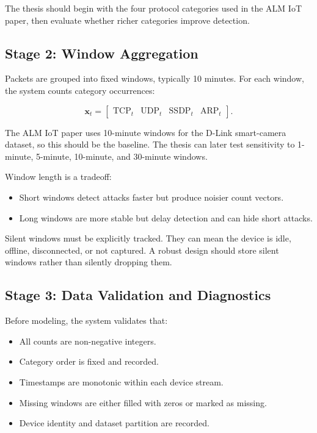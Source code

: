 \documentclass[11pt,a4paper]{article}
\begin{document}
The thesis should begin with the four protocol categories used in the ALM IoT paper, then evaluate whether richer categories improve detection.

\subsection{Stage 2: Window Aggregation}

Packets are grouped into fixed windows, typically 10 minutes. For each window, the system counts category occurrences:

\[
\mathbf{x}_t =
\begin{bmatrix}
\mathrm{TCP}_t & \mathrm{UDP}_t & \mathrm{SSDP}_t & \mathrm{ARP}_t
\end{bmatrix}.
\]

The ALM IoT paper uses 10-minute windows for the D-Link smart-camera dataset, so this should be the baseline. The thesis can later test sensitivity to 1-minute, 5-minute, 10-minute, and 30-minute windows.

Window length is a tradeoff:

\begin{itemize}
  \item Short windows detect attacks faster but produce noisier count vectors.
  \item Long windows are more stable but delay detection and can hide short attacks.
\end{itemize}

Silent windows must be explicitly tracked. They can mean the device is idle, offline, disconnected, or not captured. A robust design should store silent windows rather than silently dropping them.

\subsection{Stage 3: Data Validation and Diagnostics}

Before modeling, the system validates that:

\begin{itemize}
  \item All counts are non-negative integers.
  \item Category order is fixed and recorded.
  \item Timestamps are monotonic within each device stream.
  \item Missing windows are either filled with zeros or marked as missing.
  \item Device identity and dataset partition are recorded.
\end{itemize}
\end{document}
